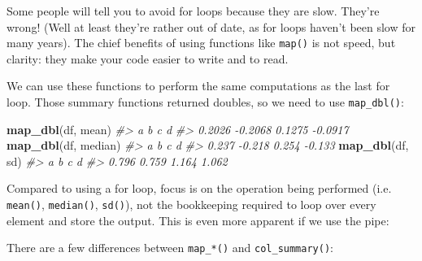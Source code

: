\documentclass[]{book}
\newenvironment{Shaded}{\begin{snugshade}}{\end{snugshade}}
\newcommand{\KeywordTok}[1]{\textcolor[rgb]{0.13,0.29,0.53}{\textbf{{#1}}}}
\newcommand{\StringTok}[1]{\textcolor[rgb]{0.31,0.60,0.02}{{#1}}}
\newcommand{\CommentTok}[1]{\textcolor[rgb]{0.56,0.35,0.01}{\textit{{#1}}}}
\newcommand{\NormalTok}[1]{{#1}}
\begin{document}
Some people will tell you to avoid for loops because they are slow.
They're wrong! (Well at least they're rather out of date, as for loops
haven't been slow for many years). The chief benefits of using functions
like \texttt{map()} is not speed, but clarity: they make your code
easier to write and to read.

We can use these functions to perform the same computations as the last
for loop. Those summary functions returned doubles, so we need to use
\texttt{map\_dbl()}:

\begin{Shaded}
\begin{Highlighting}[]
\KeywordTok{map_dbl}\NormalTok{(df, mean)}
\CommentTok{#>       a       b       c       d }
\CommentTok{#>  0.2026 -0.2068  0.1275 -0.0917}
\KeywordTok{map_dbl}\NormalTok{(df, median)}
\CommentTok{#>      a      b      c      d }
\CommentTok{#>  0.237 -0.218  0.254 -0.133}
\KeywordTok{map_dbl}\NormalTok{(df, sd)}
\CommentTok{#>     a     b     c     d }
\CommentTok{#> 0.796 0.759 1.164 1.062}
\end{Highlighting}
\end{Shaded}

Compared to using a for loop, focus is on the operation being performed
(i.e. \texttt{mean()}, \texttt{median()}, \texttt{sd()}), not the
bookkeeping required to loop over every element and store the output.
This is even more apparent if we use the pipe:

\begin{Shaded}
\end{Shaded}

There are a few differences between \texttt{map\_*()} and
\texttt{col\_summary()}:
\end{document}
